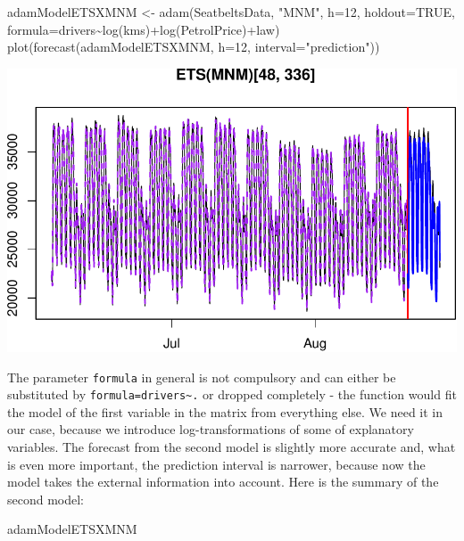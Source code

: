 \documentclass[
]{book}
\newenvironment{Shaded}{\begin{snugshade}}{\end{snugshade}}
\newcommand{\AttributeTok}[1]{\textcolor[rgb]{0.77,0.63,0.00}{#1}}
\newcommand{\ConstantTok}[1]{\textcolor[rgb]{0.00,0.00,0.00}{#1}}
\newcommand{\DecValTok}[1]{\textcolor[rgb]{0.00,0.00,0.81}{#1}}
\newcommand{\FunctionTok}[1]{\textcolor[rgb]{0.00,0.00,0.00}{#1}}
\newcommand{\NormalTok}[1]{#1}
\newcommand{\OtherTok}[1]{\textcolor[rgb]{0.56,0.35,0.01}{#1}}
\newcommand{\SpecialCharTok}[1]{\textcolor[rgb]{0.00,0.00,0.00}{#1}}
\newcommand{\StringTok}[1]{\textcolor[rgb]{0.31,0.60,0.02}{#1}}
\theoremstyle{definition}
\theoremstyle{definition}
\theoremstyle{definition}
\theoremstyle{definition}
\theoremstyle{remark}
\begin{document}
\begin{Shaded}
\begin{Highlighting}[]
\NormalTok{adamModelETSXMNM }\OtherTok{\textless{}{-}} \FunctionTok{adam}\NormalTok{(SeatbeltsData, }\StringTok{"MNM"}\NormalTok{, }\AttributeTok{h=}\DecValTok{12}\NormalTok{, }\AttributeTok{holdout=}\ConstantTok{TRUE}\NormalTok{,}
                         \AttributeTok{formula=}\NormalTok{drivers}\SpecialCharTok{\textasciitilde{}}\FunctionTok{log}\NormalTok{(kms)}\SpecialCharTok{+}\FunctionTok{log}\NormalTok{(PetrolPrice)}\SpecialCharTok{+}\NormalTok{law)}
\FunctionTok{plot}\NormalTok{(}\FunctionTok{forecast}\NormalTok{(adamModelETSXMNM, }\AttributeTok{h=}\DecValTok{12}\NormalTok{, }\AttributeTok{interval=}\StringTok{"prediction"}\NormalTok{))}
\end{Highlighting}
\end{Shaded}

\includegraphics{adam_files/figure-latex/unnamed-chunk-81-1.pdf}

The parameter \texttt{formula} in general is not compulsory and can either be substituted by \texttt{formula=drivers\textasciitilde{}.} or dropped completely - the function would fit the model of the first variable in the matrix from everything else. We need it in our case, because we introduce log-transformations of some of explanatory variables. The forecast from the second model is slightly more accurate and, what is even more important, the prediction interval is narrower, because now the model takes the external information into account. Here is the summary of the second model:

\begin{Shaded}
\begin{Highlighting}[]
\NormalTok{adamModelETSXMNM}
\end{Highlighting}
\end{Shaded}
\end{document}
